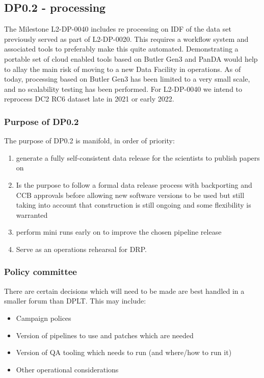 \subsection{DP0.2 - processing} \label{sec:dp0.2}

The Milestone L2-DP-0040 includes re processing on IDF of the data set previously served as part of L2-DP-0020.
This requires a workflow system and associated tools to preferably make this quite automated.
Demonstrating a portable set of cloud enabled tools based on Butler Gen3 and PanDA would help to allay the main risk of moving to a new Data Facility in operations.
As of today, processing based on Butler Gen3 has been limited to a very small scale, and no scalability testing has been performed. For L2-DP-0040 we intend to reprocess DC2 RC6  dataset late in 2021 or early 2022.

\subsubsection {Purpose of DP0.2}
The purpose of DP0.2 is manifold, in order of priority:
\begin{enumerate}
	\item generate a fully self-consistent data release for the scientists to publish papers on
	\item Is the purpose to follow a formal data release process with backporting and CCB approvals before allowing new software versions to be used but still taking into account that construction is still ongoing and some flexibility is warranted
	\item perform mini runs early on to improve the chosen pipeline release

	\item Serve as an operations rehearsal for DRP.
\end{enumerate}


\subsubsection {Policy committee}

There are certain decisions which will need to be made are best handled in a smaller forum than DPLT.
This may include:

\begin{itemize}
\item Campaign polices
\item Version of pipelines to use and patches which are needed
\item Version of QA tooling which needs to run (and where/how to run it)
\item Other operational considerations
\end{itemize}

